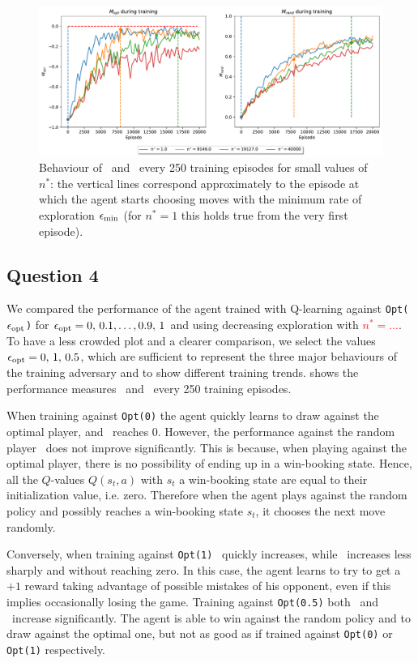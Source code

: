 \documentclass[10pt]{IEEEtran}
\begin{document}
\begin{figure}[H]
    \centering
    \includegraphics[width=\linewidth]{code/figures/performance_n_star.pdf}
    \caption{Behaviour of \mopt\  and \mrand\  every 250 training episodes for small values of $n^{*}$:  the vertical lines correspond approximately to the episode at which the agent starts choosing moves with the minimum rate of exploration $\epsilon_{\text{min}}$ (for $n^{*} = 1$ this holds true from the very first episode).}
    \label{plot_question3}
\end{figure}


\subsection*{Question 4}
We compared the performance of the agent trained with Q-learning against \texttt{Opt($\epsilon_{\text{opt}}$)} for $\epsilon_{\text{opt}} = 0, \, 0.1, \dots, 0.9, \, 1$ and using decreasing exploration with \textcolor{red}{$n^{*} = ...$}. To have a less crowded plot and a clearer comparison, we select the values $\epsilon_{\text{opt}} = 0, \, 1, \, 0.5$, which are sufficient to represent the three major behaviours of the training adversary and to show different training trends.  shows the performance measures \mopt\  and \mrand\  every 250 training episodes.

When training against \texttt{Opt(0)} the agent quickly learns to draw against the optimal player, and \mopt\  reaches 0. However, the performance against the random player \mrand\  does not improve significantly. This is because, when playing against the optimal player, there is no possibility of ending up in a win-booking state. Hence, all the $Q$-values $Q(s_t, a)$ with $s_t$ a win-booking state are equal to their initialization value, i.e. zero. Therefore when the agent plays against the random policy and possibly reaches a win-booking state $s_t$, it chooses the next move randomly. 

Conversely, when training against \texttt{Opt(1)} \mrand\  quickly increases, while \mopt\  increases less sharply and without reaching zero. In this case, the agent learns to try to get a $+1$ reward taking advantage of possible mistakes of his opponent, even if this implies occasionally losing the game. Training against \texttt{Opt(0.5)} both \mopt\  and \mrand\  increase significantly. The agent is able to win against the random policy and to draw against the optimal one, but not as good as if trained against \texttt{Opt(0)} or \texttt{Opt(1)} respectively.
\end{document}
